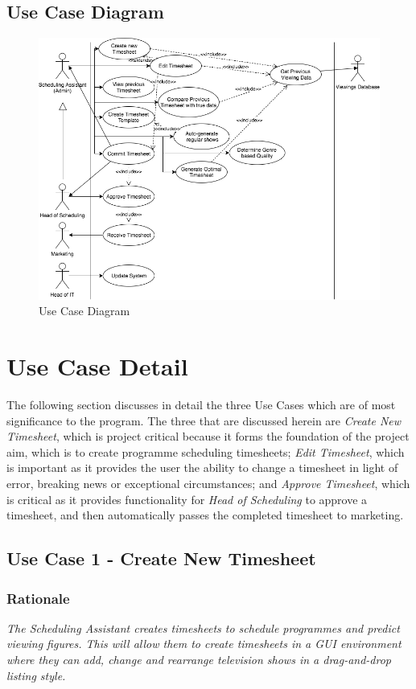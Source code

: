 \documentclass[11pt, oneside]{article}
\begin{document}
\subsection{Use Case Diagram}
\begin{figure}[H]
\centering
\includegraphics[width=\textwidth]{UseCaseDiagram}
\caption{Use Case Diagram}
\end{figure}
\section{Use Case Detail}
The following section discusses in detail the three Use Cases which are of most significance to the program. The three that are discussed herein are \textit{Create New Timesheet}, which is project critical because it forms the foundation of the project aim, which is to create programme scheduling timesheets; \textit{Edit Timesheet}, which is important as it provides the user the ability to change a timesheet in light of error, breaking news or exceptional circumstances; and \textit{Approve Timesheet}, which is critical as it provides functionality for \textit{Head of Scheduling} to approve a timesheet, and then automatically passes the completed timesheet to marketing.

\subsection{Use Case 1 - Create New Timesheet}
\subsubsection*{Rationale}
\textit{The Scheduling Assistant creates timesheets to schedule programmes and predict viewing figures. This will allow them to create timesheets in a GUI environment where they can add, change and rearrange television shows in a drag-and-drop listing style.}
\end{document}
